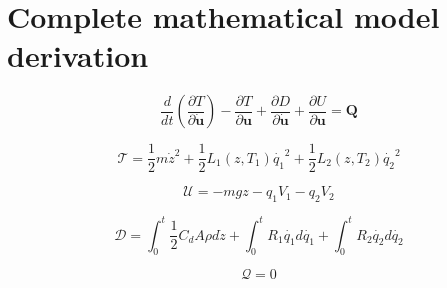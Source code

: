 \appendix
\section{Complete mathematical model derivation}
\label{app:derivation}

\begin{equation}
    \frac{d}{dt} \left( \frac{\partial T}{\partial \dot{\mathbf{u}}} \right) - \frac{\partial T}{\partial \mathbf{u}} + \frac{\partial D}{\partial \dot{\mathbf{u}}} + \frac{\partial U}{\partial \mathbf{u}} = \mathbf{Q}
\end{equation}

\begin{equation}
    \mathcal{T} = \frac{1}{2} m \dot{z}^2 + \frac{1}{2} L_1(z, T_1) \dot{q_1}^2 + \frac{1}{2} L_2(z, T_2) \dot{q_2}^2
\end{equation}

\begin{equation}
    \mathcal{U} = -m g z - q_1 V_1 - q_2 V_2
\end{equation}

\begin{equation}
    \mathcal{D} = \int_{0}^{t} \frac{1}{2} C_d A \rho d\dot{z} + \int_{0}^{t} R_1 \dot{q_1} d\dot{q_1} + \int_{0}^{t} R_2 \dot{q_2} d\dot{q_2}
\end{equation}

\begin{equation}
    \mathcal{Q} = 0
\end{equation}

